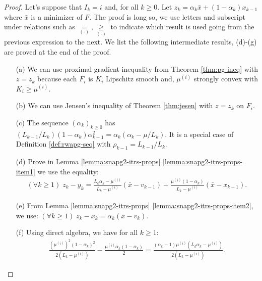 \documentclass[12pt]{article}
\begin{document}
        \begin{proof}
            Let's suppose that $I_k = i$ and, for all $k \ge 0$. 
            Let $z_k = \alpha_k \bar x + (1 - \alpha_k)x_{k - 1}$ where $\bar x$ is a minimizer of $F$. 
            The proof is long so, we use letters and subscript under relations such as $\underset{(\cdot)}{=}, \underset{(\cdot)}{\ge}$ to indicate which result is used going from the previous expression to the next. 
            We list the following intermediate results, (d)-(g) are proved at the end of the proof. 
            \begin{itemize}
                \item[(a)] We can use proximal gradient inequality from Theorem \ref{thm:pg-ineq} with $z = z_k$ because each $F_i$ is $K_i$ Lipschitz smooth and, $\mu^{(i)}$ strongly convex with $K_i \ge \mu^{(i)}$. 
                \item[(b)] We can use Jensen's inequality of Theorem \ref{thm:jesen} with $z = z_k$ on $F_i$. 
                \item[(c)] The sequence $(\alpha_k)_{k \ge 0}$ has $(L_{k - 1}/L_k)(1 - \alpha_{k})\alpha_{k - 1}^2 = \alpha_{k}\left(\alpha_{k} - \mu/L_k\right)$. It is a special case of Definition \ref{def:rwapg-seq} with $\rho_{k - 1} = L_{k - 1}/L_k$. 
                \item[(d)] Prove in Lemma \ref{lemma:snapg2-itrs-props} \ref{lemma:snapg2-itrs-props-item1} we use the equality:
                \begin{align*}
                    (\forall k \ge 1)\; 
                    z_k - y_k 
                    = 
                    \frac{L_k\alpha_k - \mu^{(i)}}{L_k - \mu^{(i)}}(\bar x - v_{k - 1})
                    + \frac{\mu^{(i)}(1 - \alpha_k)}{L_k - \mu^{(i)}}(\bar x - x_{k - 1}).
                \end{align*}
                \item [(e)] From Lemma \ref{lemma:snapg2-itrs-props} \ref{lemma:snapg2-itrs-props-item2}, we use: $(\forall k \ge 1)\; z_k - x_k = \alpha_k (\bar x - v_k)$. 
                \item [(f)] Using direct algebra, we have for all $k \ge 1$: 
                \begin{align*}
                    \frac{\left(\mu^{(i)}\right)^2(1 - \alpha_k)^2}{2(L_k - \mu^{(i)})} 
                    - \frac{\mu^{(i)}\alpha_k(1 - \alpha_k)}{2}
                    = \frac{(\alpha_k - 1)\mu^{(i)}\left(L_k\alpha_k - \mu^{(i)}\right)}
                    {2\left(L_k - \mu^{(i)}\right)}. 

\end{align*}
\end{itemize}
\end{proof}
\end{document}
